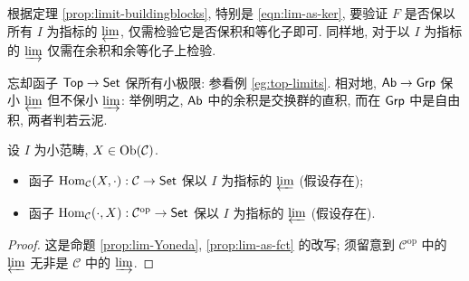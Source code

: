 \begin{remark}\label{rem:preservation-limit}
	根据定理 \ref{prop:limit-buildingblocks}, 特别是 \eqref{eqn:lim-as-ker}, 要验证 $F$ 是否保以所有 $I$ 为指标的 $\varprojlim$, 仅需检验它是否保积和等化子即可. 同样地, 对于以 $I$ 为指标的 $\varinjlim$ 仅需在余积和余等化子上检验.
\end{remark}

\begin{example}\label{eg:preservation-limit}
	忘却函子 $\mathsf{Top} \to \mathsf{Set}$ 保所有小极限: 参看例 \ref{eg:top-limits}. 相对地, $\mathsf{Ab} \to \mathsf{Grp}$ 保小 $\varprojlim$ 但不保小 $\varinjlim$: 举例明之, $\mathsf{Ab}$ 中的余积是交换群的直积, 而在 $\mathsf{Grp}$ 中是自由积, 两者判若云泥.
\end{example}

\begin{proposition}\label{prop:Hom-exact}
	设 $I$ 为小范畴, $X \in \operatorname{Ob}(\mathcal{C})$.
	\begin{itemize}
		\item 函子 $\operatorname{Hom}_{\mathcal{C}}(X, \cdot): \mathcal{C} \to \mathsf{Set}$ 保以 $I$ 为指标的 $\varprojlim$ (假设存在);
		\item 函子 $\operatorname{Hom}_{\mathcal{C}}(\cdot, X): \mathcal{C}^\text{op} \to \mathsf{Set}$	保以 $I$ 为指标的 $\varprojlim$ (假设存在).
	\end{itemize}
\end{proposition}
\begin{proof}
	这是命题 \ref{prop:lim-Yoneda}, \ref{prop:lim-as-fct} 的改写; 须留意到 $\mathcal{C}^\text{op}$ 中的 $\varprojlim$ 无非是 $\mathcal{C}$ 中的 $\varinjlim$.
\end{proof}

